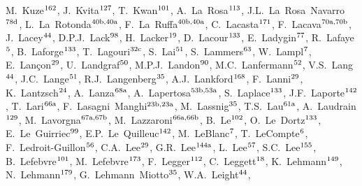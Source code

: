 \begin{flushleft}
M.~Kuze$^\textrm{\scriptsize 162}$,    
J.~Kvita$^\textrm{\scriptsize 127}$,    
T.~Kwan$^\textrm{\scriptsize 101}$,    
A.~La~Rosa$^\textrm{\scriptsize 113}$,    
J.L.~La~Rosa~Navarro$^\textrm{\scriptsize 78d}$,    
L.~La~Rotonda$^\textrm{\scriptsize 40b,40a}$,    
F.~La~Ruffa$^\textrm{\scriptsize 40b,40a}$,    
C.~Lacasta$^\textrm{\scriptsize 171}$,    
F.~Lacava$^\textrm{\scriptsize 70a,70b}$,    
J.~Lacey$^\textrm{\scriptsize 44}$,    
D.P.J.~Lack$^\textrm{\scriptsize 98}$,    
H.~Lacker$^\textrm{\scriptsize 19}$,    
D.~Lacour$^\textrm{\scriptsize 133}$,    
E.~Ladygin$^\textrm{\scriptsize 77}$,    
R.~Lafaye$^\textrm{\scriptsize 5}$,    
B.~Laforge$^\textrm{\scriptsize 133}$,    
T.~Lagouri$^\textrm{\scriptsize 32c}$,    
S.~Lai$^\textrm{\scriptsize 51}$,    
S.~Lammers$^\textrm{\scriptsize 63}$,    
W.~Lampl$^\textrm{\scriptsize 7}$,    
E.~Lan\c{c}on$^\textrm{\scriptsize 29}$,    
U.~Landgraf$^\textrm{\scriptsize 50}$,    
M.P.J.~Landon$^\textrm{\scriptsize 90}$,    
M.C.~Lanfermann$^\textrm{\scriptsize 52}$,    
V.S.~Lang$^\textrm{\scriptsize 44}$,    
J.C.~Lange$^\textrm{\scriptsize 51}$,    
R.J.~Langenberg$^\textrm{\scriptsize 35}$,    
A.J.~Lankford$^\textrm{\scriptsize 168}$,    
F.~Lanni$^\textrm{\scriptsize 29}$,    
K.~Lantzsch$^\textrm{\scriptsize 24}$,    
A.~Lanza$^\textrm{\scriptsize 68a}$,    
A.~Lapertosa$^\textrm{\scriptsize 53b,53a}$,    
S.~Laplace$^\textrm{\scriptsize 133}$,    
J.F.~Laporte$^\textrm{\scriptsize 142}$,    
T.~Lari$^\textrm{\scriptsize 66a}$,    
F.~Lasagni~Manghi$^\textrm{\scriptsize 23b,23a}$,    
M.~Lassnig$^\textrm{\scriptsize 35}$,    
T.S.~Lau$^\textrm{\scriptsize 61a}$,    
A.~Laudrain$^\textrm{\scriptsize 129}$,    
M.~Lavorgna$^\textrm{\scriptsize 67a,67b}$,    
M.~Lazzaroni$^\textrm{\scriptsize 66a,66b}$,    
B.~Le$^\textrm{\scriptsize 102}$,    
O.~Le~Dortz$^\textrm{\scriptsize 133}$,    
E.~Le~Guirriec$^\textrm{\scriptsize 99}$,    
E.P.~Le~Quilleuc$^\textrm{\scriptsize 142}$,    
M.~LeBlanc$^\textrm{\scriptsize 7}$,    
T.~LeCompte$^\textrm{\scriptsize 6}$,    
F.~Ledroit-Guillon$^\textrm{\scriptsize 56}$,    
C.A.~Lee$^\textrm{\scriptsize 29}$,    
G.R.~Lee$^\textrm{\scriptsize 144a}$,    
L.~Lee$^\textrm{\scriptsize 57}$,    
S.C.~Lee$^\textrm{\scriptsize 155}$,    
B.~Lefebvre$^\textrm{\scriptsize 101}$,    
M.~Lefebvre$^\textrm{\scriptsize 173}$,    
F.~Legger$^\textrm{\scriptsize 112}$,    
C.~Leggett$^\textrm{\scriptsize 18}$,    
K.~Lehmann$^\textrm{\scriptsize 149}$,    
N.~Lehmann$^\textrm{\scriptsize 179}$,    
G.~Lehmann~Miotto$^\textrm{\scriptsize 35}$,    
W.A.~Leight$^\textrm{\scriptsize 44}$,    

\end{flushleft}
